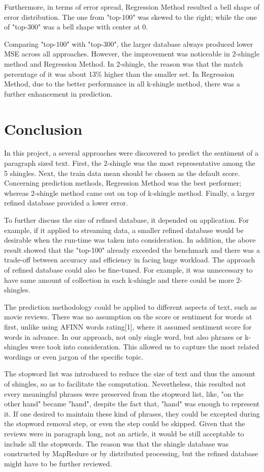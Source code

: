 Furthermore, in terms of error spread,  Regression Method resulted a bell shape of error distribution. The one from "top-100"  was skewed to the right; while the one of "top-300"  was a bell shape with center at 0.

Comparing "top-100" with "top-300", the larger database always produced lower MSE across all approaches. However, the improvement was noticeable in 2-shingle method and Regression Method. In 2-shingle, the reason was that the match percentage of it was about 13\% higher than the smaller set. In Regression Method, due to the better performance in all k-shingle method, there was a further enhancement in prediction.


\section{Conclusion}

In this project, a several approaches were discovered to predict the sentiment of a paragraph sized text. First, the 2-shingle was the most representative among the 5 shingles. Next, the train data mean should be chosen as the default score. Concerning prediction methods, Regression Method was the best performer; whereas 2-shingle method came out on top of k-shingle method. Finally, a larger refined database provided a lower error.

To further discuss the size of refined database, it depended on application. For example, if it applied to streaming data, a smaller refined database would be desirable when the run-time was taken into consideration. In addition, the above result showed that the "top-100" already exceeded the benchmark and there was a trade-off between accuracy and efficiency in facing huge workload. 
The approach of refined database could also be fine-tuned. For example, it was unnecessary to have same amount of collection in each k-shingle and there could be more 2-shingles.

The prediction methodology could be applied to different aspects of text, such as movie reviews. There was no assumption on the score or sentiment for words at first, unlike using AFINN words rating[1], where it assumed sentiment score for words in advance. In our approach, not only single word, but also phrases or k-shingles were took into consideration. This allowed us to capture the most related wordings or even jargon of the specific topic.

The stopword list was introduced to  reduce the size of text and thus the amount of shingles, so as to facilitate the computation. Nevertheless, this resulted not every meaningful phrases were preserved from the stopword list, like, "on the other hand" became "hand", despite the fact that, "hand" was enough to represent it. If one desired to maintain these kind of phrases, they could be excepted during the stopword removal step, or even the step could be skipped. Given that the reviews were in paragraph long, not an article, it would be still acceptable to include all the stopwords. The reason was that the shingle database was constructed by MapRedure or by distributed processing, but the refined database might have to be further reviewed.





